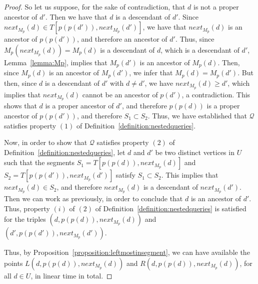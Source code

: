 \documentclass[11pt,a4paper]{article}
\begin{document}
\begin{proof}
So let us suppose, for the sake of contradiction, that $d$ is not a proper ancestor of $d'$. Then we have that $d$ is a descendant of $d'$. Since $\mathit{next}_{M_p}(d)\in T[p(p(d')),\mathit{next}_{M_p}(d')]$, we have that $\mathit{next}_{M_p}(d)$ is an ancestor of $p(p(d'))$, and therefore an ancestor of $d'$. Thus, since $M_p(\mathit{next}_{M_p}(d))=M_p(d)$ is a descendant of $d$, which is a descendant of $d'$, Lemma~\ref{lemma:Mp}, implies that $M_p(d')$ is an ancestor of $M_p(d)$. Then, since $M_p(d)$ is an ancestor of $M_p(d')$, we infer that $M_p(d)=M_p(d')$. But then, since $d$ is a descendant of $d'$ with $d\neq d'$, we have $\mathit{next}_{M_p}(d)\geq d'$, which implies that $\mathit{next}_{M_p}(d)$ cannot be an ancestor of $p(d')$, a contradiction. This shows that $d$ is a proper ancestor of $d'$, and therefore $p(p(d))$ is a proper ancestor of $p(p(d'))$, and therefore $S_1\subset S_2$. Thus, we have established that $\mathcal{Q}$ satisfies property $(1)$ of Definition~\ref{definition:nestedqueries}.



Now, in order to show that $\mathcal{Q}$ satisfies property $(2)$ of Definition~\ref{definition:nestedqueries}, let $d$ and $d'$ be two distinct vertices in $U$ such that the segments $S_1=T[p(p(d)),\mathit{next}_{M_p}(d)]$ and $S_2=T[p(p(d')),\mathit{next}_{M_p}(d')]$ satisfy $S_1\subset S_2$. This implies that $\mathit{next}_{M_p}(d)\in S_2$, and therefore $\mathit{next}_{M_p}(d)$ is a descendant of $\mathit{next}_{M_p}(d')$. Then we can work as previously, in order to conclude that $d$ is an ancestor of $d'$. Thus, property $(i)$ of $(2)$ of Definition~\ref{definition:nestedqueries} is satisfied for the triples $(d,p(p(d)),\mathit{next}_{M_p}(d))$ and $(d',p(p(d')),\mathit{next}_{M_p}(d'))$.

Thus, by Proposition~\ref{proposition:leftmostinsegment}, we can have available the points $L(d,p(p(d)),\mathit{next}_{M_p}(d))$ and $R(d,p(p(d)),\mathit{next}_{M_p}(d))$, for all $d\in U$, in linear time in total. 


\end{proof}
\end{document}
